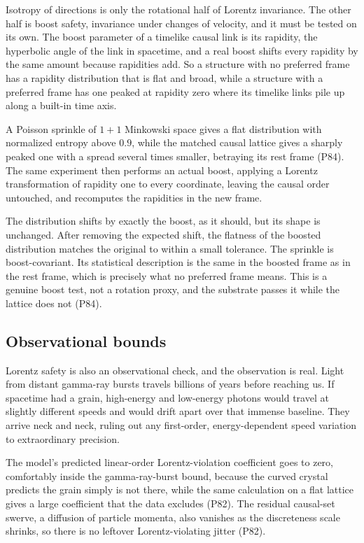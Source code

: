 Isotropy of directions is only the rotational half of Lorentz invariance. The other half is boost safety,
invariance under changes of velocity, and it must be tested on its own. The boost parameter of a timelike
causal link is its rapidity, the hyperbolic angle of the link in spacetime, and a real boost shifts every
rapidity by the same amount because rapidities add. So a structure with no preferred frame has a rapidity
distribution that is flat and broad, while a structure with a preferred frame has one peaked at rapidity zero
where its timelike links pile up along a built-in time axis.

A Poisson sprinkle of $1+1$ Minkowski space gives
a flat distribution with normalized entropy above $0.9$, while the matched causal lattice gives a sharply
peaked one with a spread several times smaller, betraying its rest frame (P84). The same experiment then
performs an actual boost, applying a Lorentz transformation of rapidity one to every coordinate, leaving the
causal order untouched, and recomputes the rapidities in the new frame.

The distribution shifts by exactly
the boost, as it should, but its shape is unchanged. After removing the expected shift, the flatness of the
boosted distribution matches the original to within a small tolerance. The sprinkle is boost-covariant. Its
statistical description is the same in the boosted frame as in the rest frame, which is precisely what no
preferred frame means. This is a genuine boost test, not a rotation proxy, and the substrate passes it while
the lattice does not (P84).

\subsection{Observational bounds}

Lorentz safety is also an observational check, and the observation is real. Light from distant gamma-ray
bursts travels billions of years before reaching us. If spacetime had a grain, high-energy and low-energy
photons would travel at slightly different speeds and would drift apart over that immense baseline. They
arrive neck and neck, ruling out any first-order, energy-dependent speed variation to extraordinary
precision.

The model's predicted linear-order Lorentz-violation coefficient goes to zero, comfortably inside
the gamma-ray-burst bound, because the curved crystal predicts the grain simply is not there, while the same
calculation on a flat lattice gives a large coefficient that the data excludes (P82). The residual causal-set
swerve, a diffusion of particle momenta, also vanishes as the discreteness scale shrinks, so there is no
leftover Lorentz-violating jitter (P82).

